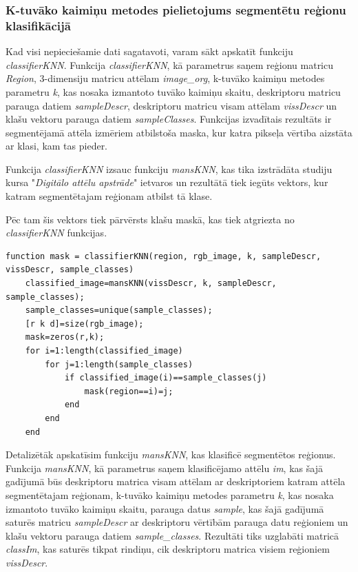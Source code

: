 \documentclass[12pt,paper=a4]{report}
\begin{document}
\subsubsection{K-tuvāko kaimiņu metodes pielietojums segmentētu reģionu klasifikācijā}
Kad visi nepieciešamie dati sagatavoti, varam sākt apskatīt funkciju \textit{classifierKNN}. Funkcija \textit{classifierKNN}, kā parametrus saņem reģionu matricu \textit{Region}, 3-dimensiju matricu attēlam \textit{image_org}, k-tuvāko kaimiņu metodes parametru \textit{k}, kas nosaka izmantoto tuvāko kaimiņu skaitu, deskriptoru matricu parauga datiem \textit{sampleDescr}, deskriptoru matricu visam attēlam \textit{vissDescr} un klašu vektoru parauga datiem \textit{sampleClasses}. Funkcijas izvadītais rezultāts ir segmentējamā attēla izmēriem atbilstoša maska, kur katra pikseļa vērtība aizstāta ar klasi, kam tas pieder. \par
Funkcija \textit{classifierKNN} izsauc funkciju \textit{mansKNN}, kas tika izstrādāta studiju kursa "\textit{Digitālo attēlu apstrāde}" ietvaros un rezultātā tiek iegūts vektors, kur katram segmentētajam reģionam atbilst tā klase. \par
Pēc tam šis vektors tiek pārvērsts klašu maskā, kas tiek atgriezta no \textit{classifierKNN} funkcijas.
\begin{lstlisting}
function mask = classifierKNN(region, rgb_image, k, sampleDescr, vissDescr, sample_classes)
	classified_image=mansKNN(vissDescr, k, sampleDescr, sample_classes);
	sample_classes=unique(sample_classes);
	[r k d]=size(rgb_image);
	mask=zeros(r,k);
	for i=1:length(classified_image)
		for j=1:length(sample_classes)
			if classified_image(i)==sample_classes(j)
				mask(region==i)=j;
			end
		end
	end
\end{lstlisting}\par
Detalizētāk apskatīsim funkciju \textit{mansKNN}, kas klasificē segmentētos reģionus. Funkcija \textit{mansKNN}, kā parametrus saņem klasificējamo attēlu \textit{im}, kas šajā gadījumā būs deskriptoru matrica visam attēlam ar deskriptoriem katram attēla segmentētajam reģionam, k-tuvāko kaimiņu metodes parametru \textit{k}, kas nosaka izmantoto tuvāko kaimiņu skaitu, parauga datus \textit{sample}, kas šajā gadījumā saturēs matricu \textit{sampleDescr} ar deskriptoru vērtībām parauga datu reģioniem un klašu vektoru parauga datiem \textit{sample_classes}. Rezultāti tiks uzglabāti matricā \textit{classIm}, kas saturēs tikpat rindiņu, cik deskriptoru matrica visiem reģioniem \textit{vissDescr}.\par
\end{document}
